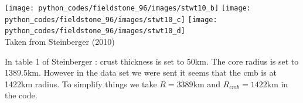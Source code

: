 \begin{center}
\texttt{[image: python\_codes/fieldstone\_96/images/stwt10\_b]}
\texttt{[image: python\_codes/fieldstone\_96/images/stwt10\_c]}
\texttt{[image: python\_codes/fieldstone\_96/images/stwt10\_d]}\\
{\captionfont Taken from Steinberger \etal (2010) \cite{stwt10}}
\end{center}

In table 1 of Steinberger \etal \cite{stwt10}: crust thickness is set to 50km. The core radius is set 
to 1389.5km. However in the data set we were sent it seems that the cmb is at 1422\si{\km}
radius.
To simplify things we take $R=3389\si{\km}$ and $R_{cmb}=1422\si{\km}$ in the code.






